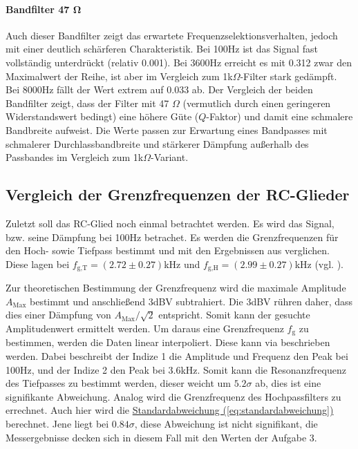 
\paragraph{Bandfilter 47 $\mathbf{\Omega}$}
Auch dieser Bandfilter zeigt das erwartete Frequenzselektionsverhalten, jedoch mit einer deutlich schärferen Charakteristik. Bei 100Hz ist das Signal fast vollständig unterdrückt (relativ 0.001). Bei 3600Hz erreicht es mit 0.312 zwar den Maximalwert der Reihe, ist aber im Vergleich zum 1k$\Omega$-Filter stark gedämpft. Bei 8000Hz fällt der Wert extrem auf 0.033 ab. Der Vergleich der beiden Bandfilter zeigt, dass der Filter mit 47 $\Omega$ (vermutlich durch einen geringeren Widerstandswert bedingt) eine höhere Güte ($Q$-Faktor) und damit eine schmalere Bandbreite aufweist. Die Werte passen zur Erwartung eines Bandpasses mit schmalerer Durchlassbandbreite und stärkerer Dämpfung außerhalb des Passbandes im Vergleich zum 1k$\Omega$-Variant.

\subsection{Vergleich der Grenzfrequenzen der RC-Glieder}
Zuletzt soll das RC-Glied noch einmal betrachtet werden. Es wird das Signal, bzw. seine Dämpfung bei 100Hz betrachet. Es werden die Grenzfrequenzen für den Hoch- sowie Tiefpass bestimmt und mit den Ergebnissen aus  verglichen. Diese lagen bei $f_\text{g,T} = (2.72 \pm 0.27)$kHz und $f_\text{g,H} = (2.99 \pm 0.27)$kHz (vgl. ).

Zur theoretischen Bestimmung der Grenzfrequenz wird die maximale Amplitude $A_\text{Max}$ bestimmt und anschließend $3$dBV subtrahiert. Die $3$dBV rühren daher, dass dies einer Dämpfung von $A_\text{Max}/\sqrt{2}$ entspricht. Somit kann der gesuchte Amplitudenwert
ermittelt werden. Um daraus eine Grenzfrequenz $f_\text{g}$ zu bestimmen, werden die Daten linear interpoliert. Diese kann via
beschrieben werden. Dabei beschreibt der Indize 1 die Amplitude und Frequenz den Peak bei 100Hz, und der Indize 2 den Peak bei 3.6kHz. Somit kann die Resonanzfrequenz des Tiefpasses zu
bestimmt werden, dieser weicht um $5.2\sigma$ ab, dies ist eine signifikante Abweichung. 
Analog wird die Grenzfrequenz des Hochpassfilters zu
errechnet. Auch hier wird die \hyperref[eq:standardabweichung]{Standardabweichung (\ref*{eq:standardabweichung})} berechnet. Jene liegt bei $0.84\sigma$, diese Abweichung ist nicht signifikant, die Messergebnisse decken sich in diesem Fall mit den Werten der Aufgabe 3.